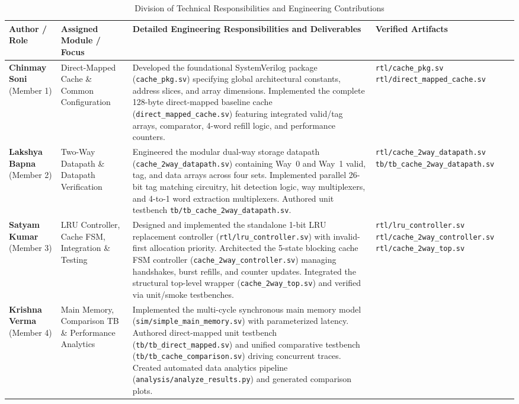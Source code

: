 \documentclass[conference]{IEEEtran}
\begin{document}
\begin{table}[htbp]
\caption{Division of Technical Responsibilities and Engineering Contributions}
\label{tab:member_contributions}
\centering
\begin{tabularx}{\textwidth}{lp{3.2cm}Xp{4.6cm}}
\toprule
\textbf{Author / Role} & \textbf{Assigned Module / Focus} & \textbf{Detailed Engineering Responsibilities and Deliverables} & \textbf{Verified Artifacts} \\
\midrule
\textbf{Chinmay Soni} (Member 1) & Direct-Mapped Cache \& Common Configuration &
Developed the foundational SystemVerilog package (\texttt{cache\_pkg.sv}) specifying global architectural constants, address slices, and array dimensions. Implemented the complete 128-byte direct-mapped baseline cache (\texttt{direct\_mapped\_cache.sv}) featuring integrated valid/tag arrays, comparator, 4-word refill logic, and performance counters. &
\texttt{rtl/cache\_pkg.sv} \newline \texttt{rtl/direct\_mapped\_cache.sv} \\
\addlinespace[0.2em]
\textbf{Lakshya Bapna} (Member 2) & Two-Way Datapath \& Datapath Verification &
Engineered the modular dual-way storage datapath (\texttt{cache\_2way\_datapath.sv}) containing Way~0 and Way~1 valid, tag, and data arrays across four sets. Implemented parallel 26-bit tag matching circuitry, hit detection logic, way multiplexers, and 4-to-1 word extraction multiplexers. Authored unit testbench \texttt{tb/tb\_cache\_2way\_datapath.sv}. &
\texttt{rtl/cache\_2way\_datapath.sv} \newline \texttt{tb/tb\_cache\_2way\_datapath.sv} \\
\addlinespace[0.2em]
\textbf{Satyam Kumar} (Member 3) & LRU Controller, Cache FSM, Integration \& Testing &
Designed and implemented the standalone 1-bit LRU replacement controller (\texttt{rtl/lru\_controller.sv}) with invalid-first allocation priority. Architected the 5-state blocking cache FSM controller (\texttt{cache\_2way\_controller.sv}) managing handshakes, burst refills, and counter updates. Integrated the structural top-level wrapper (\texttt{cache\_2way\_top.sv}) and verified via unit/smoke testbenches. &
\texttt{rtl/lru\_controller.sv} \newline \texttt{rtl/cache\_2way\_controller.sv} \newline \texttt{rtl/cache\_2way\_top.sv} \\
\addlinespace[0.2em]
\textbf{Krishna Verma} (Member 4) & Main Memory, Comparison TB \& Performance Analytics &
Implemented the multi-cycle synchronous main memory model (\texttt{sim/simple\_main\_memory.sv}) with parameterized latency. Authored direct-mapped unit testbench (\texttt{tb/tb\_direct\_mapped.sv}) and unified comparative testbench (\texttt{tb/tb\_cache\_comparison.sv}) driving concurrent traces. Created automated data analytics pipeline (\texttt{analysis/analyze\_results.py}) and generated comparison plots. &

\end{tabularx}
\end{table}
\end{document}
